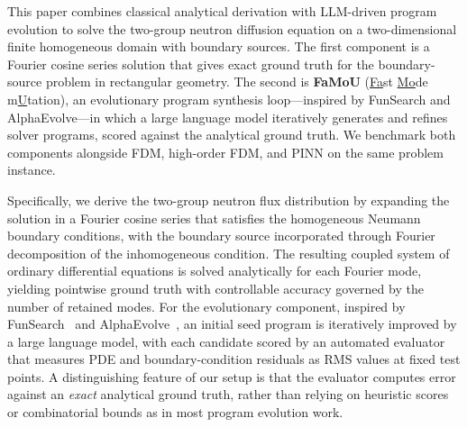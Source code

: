 This paper combines classical analytical derivation with LLM-driven program evolution to solve the two-group neutron diffusion equation on a two-dimensional finite homogeneous domain with boundary sources.
The first component is a Fourier cosine series solution that gives exact ground truth for the boundary-source problem in rectangular geometry.
The second is \textbf{FaMoU} (\underline{Fa}st \underline{Mo}de m\underline{U}tation), an evolutionary program synthesis loop---inspired by FunSearch and AlphaEvolve---in which a large language model iteratively generates and refines solver programs, scored against the analytical ground truth.
We benchmark both components alongside FDM, high-order FDM, and PINN on the same problem instance.

Specifically, we derive the two-group neutron flux distribution by expanding the solution in a Fourier cosine series that satisfies the homogeneous Neumann boundary conditions, with the boundary source incorporated through Fourier decomposition of the inhomogeneous condition.
The resulting coupled system of ordinary differential equations is solved analytically for each Fourier mode, yielding pointwise ground truth with controllable accuracy governed by the number of retained modes.
For the evolutionary component, inspired by FunSearch~\cite{funsearch2024} and AlphaEvolve~\cite{alphaevolve2025}, an initial seed program is iteratively improved by a large language model, with each candidate scored by an automated evaluator that measures PDE and boundary-condition residuals as RMS values at fixed test points.
A distinguishing feature of our setup is that the evaluator computes error against an \emph{exact} analytical ground truth, rather than relying on heuristic scores or combinatorial bounds as in most program evolution work.

